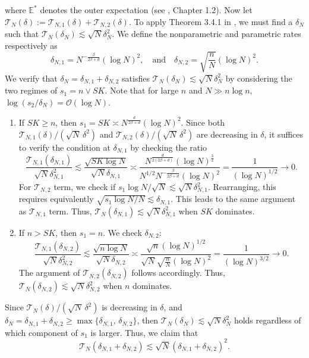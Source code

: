 \documentclass[
  12pt]{article}
\begin{document}
\noindent where $\mathbb{E}^*$ denotes the outer expectation (see \cite{van1996weak}, Chapter 1.2). Now let $\mathcal{T}_{N}(\delta):=\mathcal{T}_{N,1}(\delta)+\mathcal{T}_{N,2}(\delta)$. To apply Theorem 3.4.1 in \cite{van1996weak}, we must find a $\delta_N$ such that $\mathcal{T}_{N}(\delta_N) \lesssim \sqrt{N}\delta_N^2$. We define the nonparametric and parametric rates respectively as
$$ \delta_{N,1} = N^{-\frac{\beta}{2\beta +d}}(\log N)^{2}, \quad \text{and} \quad \delta_{N,2} = \sqrt{\frac{n}{N}}(\log N)^2. $$
\noindent We verify that $\delta_N = \delta_{N,1} + \delta_{N,2}$ satisfies  $\mathcal{T}_{N}(\delta_N) \lesssim \sqrt{N}\delta_N^2$ by considering the two regimes of $s_1 = n \vee SK$. Note that for large $n$ and $N\gg n \log n$, $\log(s_2/\delta_N) = \mathcal{O} (\log N)$.
\begin{enumerate}
    \item If $SK \geq n$, then $s_1 = SK \asymp N^{\frac{d}{2\beta+d}}({\log} N)^{2}$. Since both $\mathcal{T}_{N,1}(\delta)/(\sqrt{N}\,\delta^2)$ and $\mathcal{T}_{N,2}(\delta)/(\sqrt{N}\,\delta^2)$ are decreasing in $\delta$, it suffices to verify the condition at $\delta_{N,1}$ by checking the ratio
$$
\frac{\mathcal{T}_{N,1}(\delta_{N,1})}{\sqrt{N}\delta_{N,1}^2} \lesssim  \frac{\sqrt{SK \log N}}{\sqrt{N}\delta_{N,1}} \asymp \frac{N^{\frac{d}{2(2\beta+d)}} (\log N)^{\frac{3}{2}}}{N^{1/2} N^{-\frac{\beta}{2\beta+d}} ({\log} N)^{2}} = \frac{1}{(\log N)^{1/2}} \to 0.
$$
For $\mathcal{T}_{N,2}$ term, we check if ${s_1} \log N/{\sqrt{N}} \lesssim \sqrt{N} \delta_{N,1}^2$. Rearranging, this requires equivalently $\sqrt{ s_1\log N /N } \lesssim \delta_{N,1}$. This leads to the same argument as $\mathcal{T}_{N,1}$ term. Thus, $\mathcal{T}_{N}(\delta_{N,1}) \lesssim \sqrt{N}\delta_{N,1}^2$ when $SK$ dominates.

\item If $n > SK$, then $s_1 = n$. We check $\delta_{N,2}$:
$$
\frac{\mathcal{T}_{N,1}(\delta_{N,2})}{\sqrt{N}\delta_{N,2}^2} \lesssim  \frac{\sqrt{n \log N}}{\sqrt{N}\delta_{N,2}} \asymp \frac{\sqrt{n}(\log N)^{1/2}}{\sqrt{N} \sqrt{\frac{n}{N}} (\log N)^2} = \frac{1}{(\log N)^{3/2}} \to 0.
$$
\noindent The  argument of $\mathcal{T}_{N,2}(\delta_{N,2})$ follows accordingly. Thus, $\mathcal{T}_{N}(\delta_{N,2}) \lesssim \sqrt{N}\delta_{N,2}^2$ when $n$ dominates.
\end{enumerate}


\noindent Since $\mathcal{T}_{N}(\delta)/(\sqrt{N}\,\delta^2)$ is decreasing in $\delta$, and  $\delta_N = \delta_{N,1} + \delta_{N,2} \geq \max\{\delta_{N,1},\,\delta_{N,2}\}$, then $\mathcal{T}_{N}(\delta_N) \lesssim \sqrt{N}\delta_N^2$ holds regardless of which component of $s_1$ is larger. Thus, we claim that
\begin{equation}\label{wellinger_condition}
\mathcal{T}_{N}\left(\delta_{N,1} + \delta_{N,2}\right) \lesssim \sqrt{N}(\delta_{N,1} + \delta_{N,2})^2.
\end{equation}
\end{document}

